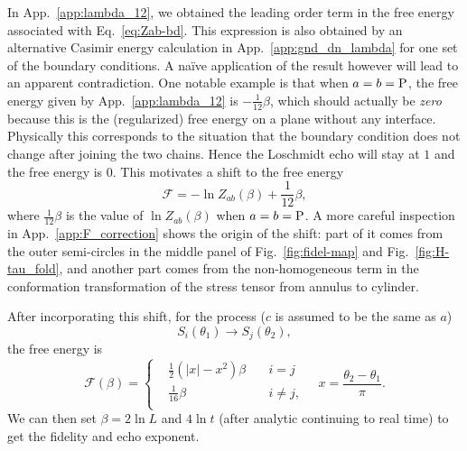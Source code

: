 In App.~\ref{app:lambda_12}, we obtained the leading order term in the free energy associated with Eq.~\eqref{eq:Zab-bd}. This expression is also obtained by an alternative Casimir energy calculation in App.~\ref{app:gnd_dn_lambda} for one set of the boundary conditions. A na\"ive application of the result however will lead to an apparent contradiction. One notable example is that when $a = b  = {\rm P}$, the free energy given by App.~\ref{app:lambda_12} is $- \frac{1}{12}\beta$, which should actually be {\it zero} because this is the (regularized) free energy on a plane without any interface. Physically this corresponds to the situation that the boundary condition does not change after joining the two chains. Hence the Loschmidt echo will stay at $1$ and the free energy is $0$. This motivates a shift to the free energy
\begin{equation}
\mathcal{F} = - \ln Z_{ab} ( \beta ) + \frac{1}{12} \beta ,
\end{equation}
where $\frac{1}{12}\beta$ is the value of $ \ln Z_{ab} ( \beta )$ when $a = b = {\rm P}$. A more careful inspection in App.~\ref{app:F_correction} shows the origin of the shift: part of it comes from the outer semi-circles in the middle panel of Fig.~\ref{fig:fidel-map} and Fig.~\ref{fig:H-tau_fold}, and another part comes from the non-homogeneous term in the conformation transformation of the stress tensor from annulus to cylinder. 

After incorporating this shift, for the process ($c$ is assumed to be the same as $a$)
\begin{equation}
\label{eq:S_i_S_j}
S_i( \theta_1 ) \rightarrow S_j( \theta_2 ) ,
\end{equation}
the free energy is
\begin{equation}
\mathcal{F}( \beta )  = 
\left\lbrace
\begin{aligned}
  &\frac{1}{2}(|x| - x^2 )\beta  \quad &i = j \\
  &\frac{1}{16}\beta   \quad &i \ne j ,  \\
\end{aligned} \right. \quad x = \frac{\theta_2 - \theta_1}{\pi} .
\end{equation}
We can then set $\beta = 2 \ln L$ and $ 4 \ln t$ (after analytic continuing to real time) to get the fidelity and echo exponent. 


